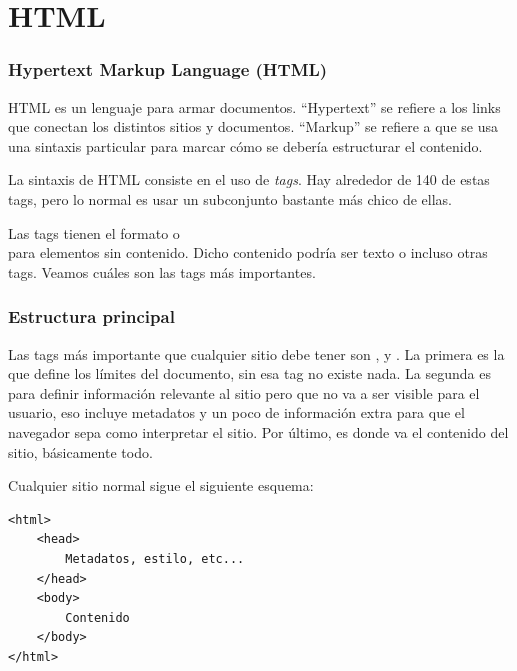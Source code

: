 \section{HTML}\label{sec:HTML}

\begin{frame}[fragile]
    \frametitle{Hypertext Markup Language (HTML)}
    
    HTML es un lenguaje para armar documentos. ``Hypertext'' se 
    refiere a los links que conectan los distintos sitios y documentos. 
    ``Markup'' se refiere a que se usa una sintaxis particular para 
    marcar cómo se debería estructurar el contenido.

    La sintaxis de HTML consiste en el uso de \emph{tags}. Hay alrededor de 
    140 de estas tags, pero lo normal es usar un subconjunto bastante 
    más chico de ellas. 
    
    Las tags tienen el formato  o \\
     para elementos sin contenido. Dicho contenido 
    podría ser texto o incluso otras tags. Veamos cuáles son las tags más importantes.

\end{frame}

\begin{frame}[fragile]
    \frametitle{Estructura principal}
    
    Las tags más importante que cualquier sitio debe tener son , 
     y . La primera es la que define los límites del documento, 
    sin esa tag no existe nada. La segunda es para definir información relevante 
    al sitio pero que no va a ser visible para el usuario, eso incluye metadatos 
    y un poco de información extra para que el navegador sepa como interpretar el 
    sitio. Por último,  es donde va el contenido del sitio, básicamente todo.

    Cualquier sitio normal sigue el siguiente esquema:

    \begin{lstlisting}
<html>
    <head>
        Metadatos, estilo, etc...
    </head>
    <body>
        Contenido
    </body>
</html>
    \end{lstlisting}

\end{frame}

